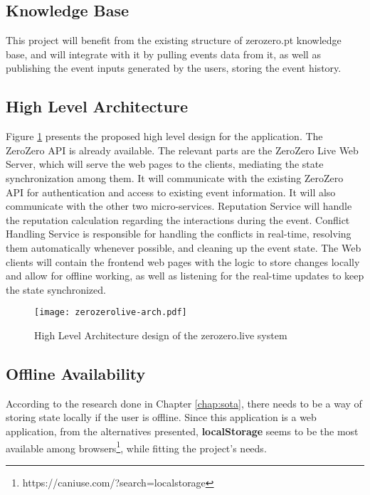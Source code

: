 \subsection{Knowledge Base}
This project will benefit from the existing structure of zerozero.pt knowledge base, and will integrate with it by pulling events data from it, as well as publishing the event inputs generated by the users, storing the event history.

\subsection{High Level Architecture}

Figure \ref{fig:high-level-arch} presents the proposed high level design for the application. The ZeroZero API is already available. The relevant parts are the ZeroZero Live Web Server, which will serve the web pages to the clients, mediating the state synchronization among them. It will communicate with the existing ZeroZero API for authentication and access to existing event information. It will also communicate with the other two micro-services. Reputation Service will handle the reputation calculation regarding the interactions during the event. Conflict Handling Service is responsible for handling the conflicts in real-time, resolving them automatically whenever possible, and cleaning up the event state. The Web clients will contain the frontend web pages with the logic to store changes locally and allow for offline working, as well as listening for the real-time updates to keep the state synchronized.

\begin{figure}[t]
    \begin{center}
        \leavevmode
        \texttt{[image: zerozerolive-arch.pdf]}
        \caption{High Level Architecture design of the zerozero.live system}
        \label{fig:high-level-arch}
    \end{center}
\end{figure}

\subsection{Offline Availability} \label{sec:prob-solution-offline-avail}
According to the research done in Chapter \ref{chap:sota}, there needs to be a way of storing state locally if the user is offline. Since this application is a web application, from the alternatives presented, \textbf{localStorage} seems to be the most available among browsers\footnote{https://caniuse.com/?search=localstorage}, while fitting the project's needs. 

